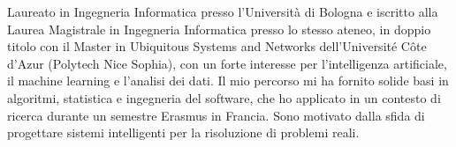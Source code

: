 \documentclass[11pt, a4paper]{../awesome-cv}
\begin{document}
\makecvheader[C]


\begin{cvparagraph}
Laureato in Ingegneria Informatica presso l'Università di Bologna e iscritto alla Laurea Magistrale in Ingegneria
Informatica presso lo stesso ateneo, in doppio titolo con il Master in Ubiquitous Systems and Networks
dell'Université Côte d'Azur (Polytech Nice Sophia), con un forte interesse per l'intelligenza artificiale, il machine
learning e l'analisi dei dati. Il mio percorso mi ha fornito solide basi in algoritmi, statistica e ingegneria del
software, che ho applicato in un contesto di ricerca durante un semestre Erasmus in Francia. Sono motivato dalla
sfida di progettare sistemi intelligenti per la risoluzione di problemi reali.
\end{cvparagraph}
\end{document}
